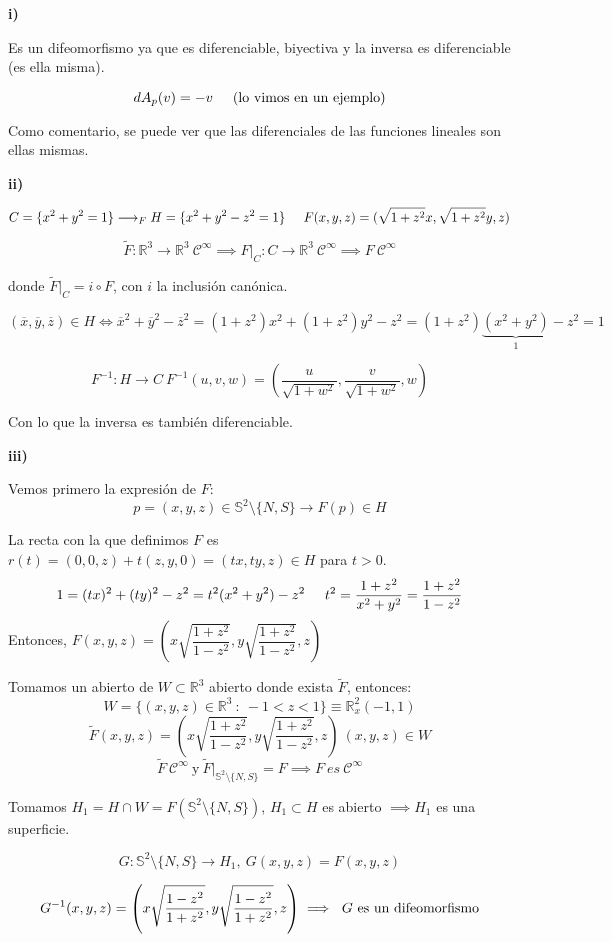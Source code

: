 \documentclass[openany]{book}
\begin{document}
\begin{exercise}

    \textbf{i)}

    Es un difeomorfismo ya que es diferenciable, biyectiva y la inversa es diferenciable (es ella misma).

    $$ dA_{p}(v) = -v \hspace{5mm} \text{(lo vimos en un ejemplo)}  $$

    Como comentario, se puede ver que las diferenciales de las funciones lineales son ellas mismas.

    \textbf{ii)}

    $$ C = \{x^2+y^2=1\}\longrightarrow_{F} H = \{x^2+y^2-z^2 = 1\}\hspace{5mm}F(x,y,z) = (\sqrt{1+z^2}x,\sqrt{1+z^2}y,z)$$

    $$ \widetilde{F}: \mathbb{R} ^3 \to \mathbb{R} ^3\ \mathcal{C}^{\infty} \implies F|_{C} : C \to \mathbb{R} ^3\ \mathcal{C}^{\infty} \implies F\ \mathcal{C} ^{\infty}$$
    
    donde $ \widetilde{F}|_{C} = i \circ F $, con $ i $ la inclusión canónica. 

    $$ (\overline{x},\overline{y},\overline{z}) \in H \iff \overline{x} ^2 +\overline{y} ^2 -\overline{z} ^2  = (1+z^2)x^2 + (1+z^2)y^2-z^2 = (1+z^2)\underbrace{(x^2+y^2)}_{1}-z ^2  = 1 $$


    $$ F ^{-1}: H \to C\ F ^{-1}(u,v,w) = (\dfrac{u}{\sqrt{1+w^2}},\dfrac{v}{\sqrt{1+w^2}},w) $$

    Con lo que la inversa es también diferenciable.

    \textbf{iii)}

    Vemos primero la expresión de $ F $:
    $$ p = (x,y,z) \in \mathbb{S}^2 \setminus \{N,S\} \to F(p) \in H $$
    
    La recta con la que definimos $ F $ es $ r(t) = (0,0,z) + t(z,y,0) = (tx,ty,z) \in H $ para $ t > 0 $.
    $$ 1 = (tx)^2+(ty)^2-z^2 = t^2(x^2+y^2)-z^2\hspace{5mm}t^2=\dfrac{1+z^2}{x^2+y^2}= \dfrac{1+z^2}{1-z^2} $$
    Entonces, $ F(x,y,z) = \left(x \sqrt{\dfrac{1+z^2}{1-z^2}},y \sqrt{\dfrac{1+z^2}{1-z^2}},z\right) $

    Tomamos un abierto de $ W \subset \mathbb{R}^3 $ abierto donde exista $ \widetilde{F}$, entonces:
    $$ W = \{(x,y,z) \in \mathbb{R} ^3\ :\ -1<z<1 \} \equiv \mathbb{R}^2_{x}(-1,1)$$
    $$ \widetilde{F}(x,y,z) = \left(x \sqrt{\dfrac{1+z^2}{1-z^2}},y \sqrt{\dfrac{1+z^2}{1-z^2}},z\right)\ (x,y,z) \in W $$
    $$ \widetilde{F}\ \mathcal{C}^{\infty}\ \text{y}\ \widetilde{F}|_{\mathbb{S}^2 \setminus \{N,S\}} = F \implies  F\ es\ \mathcal{C}^{\infty}$$ 

    Tomamos $ H_1 = H \cap W = F(\mathbb{S}^2 \setminus \{N,S\}) $, $ H_1 \subset H $ es abierto $ \implies  H_1$ es una superficie.

    $$ G: \mathbb{S}^2 \setminus \{N,S\} \to H_1,\ G(x,y,z) = F(x,y,z) $$

    $$ G ^{-1}(x,y,z) = \left(x \sqrt{\dfrac{1-z^2}{1+z^2}},y \sqrt{\dfrac{1-z^2}{1+z^2}},z\right) \implies \text{ $ G $ es un difeomorfismo} $$
 

\end{exercise}
\end{document}
